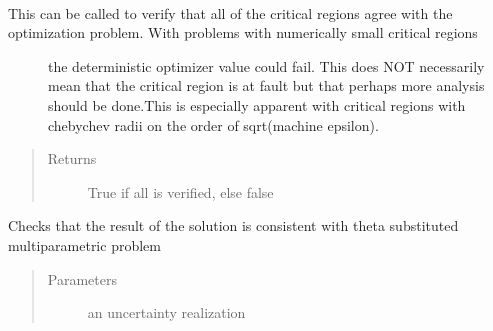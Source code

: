 \documentclass[letterpaper,10pt,english]{sphinxmanual}
\begin{document}
\begin{fulllineitems}

\begin{fulllineitems}
\label{\detokenize{ppopt:ppopt.solution.Solution.theta_dim}}
\end{fulllineitems}


\begin{fulllineitems}
\label{\detokenize{ppopt:ppopt.solution.Solution.verify_solution}}~\begin{description}
\item[{This can be called to verify that all of the critical regions agree with the optimization problem. With problems with numerically small critical regions}] \leavevmode
\sphinxAtStartPar
the deterministic optimizer value could fail. This does NOT necessarily mean that the critical region is at fault but that perhaps more analysis should be done.This is especially apparent with critical regions with chebychev radii on the order of sqrt(machine epsilon).

\end{description}
\begin{quote}\begin{description}
\item[{Returns}] \leavevmode
\sphinxAtStartPar
True if all is verified, else false

\end{description}\end{quote}

\end{fulllineitems}


\begin{fulllineitems}
\label{\detokenize{ppopt:ppopt.solution.Solution.verify_theta}}
\sphinxAtStartPar
Checks that the result of the solution is consistent with theta substituted multiparametric problem
\begin{quote}\begin{description}
\item[{Parameters}] \leavevmode
\sphinxAtStartPar
{} \textendash{} an uncertainty realization


\end{description}
\end{quote}
\end{fulllineitems}
\end{fulllineitems}
\end{document}

